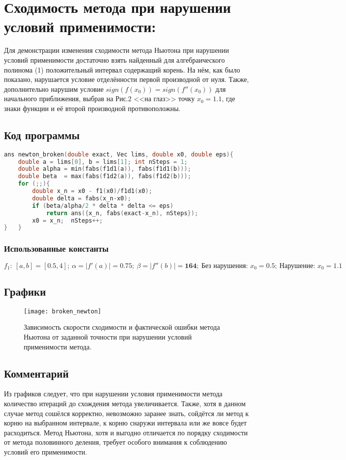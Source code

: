 \clearpage

\section{Сходимость метода при нарушении условий применимости:}
Для демонстрации изменения сходимости метода Ньютона при нарушении условий применимости достаточно взять найденный  для алгебраического полинома (1) положительный интервал содержащий корень. На нём, как было показано, нарушается условие отделённости первой производной от нуля. Также, дополнительно нарушим условие $sign(f(x_0))=sign(f''(x_0))$ для начального приближения, выбрав на Рис.2 <<на глаз>> точку $x_0=1.1$, где знаки функции и её второй производной противоположны.
\subsection{Код программы}
\begin{lstlisting}[language=c++, firstnumber=39]
ans newton_broken(double exact, Vec lims, double x0, double eps){
    double a = lims[0], b = lims[1]; int nSteps = 1;
    double alpha = min(fabs(f1d1(a)), fabs(f1d1(b)));
    double beta  = max(fabs(f1d2(a)), fabs(f1d2(b)));
    for (;;){
        double x_n = x0 - f1(x0)/f1d1(x0);
        double delta = fabs(x_n-x0);
        if (beta/alpha/2 * delta * delta <= eps)
            return ans({x_n, fabs(exact-x_n), nSteps});
        x0 = x_n;  nSteps++;
}   }
\end{lstlisting}
\subsubsection{Использованные константы}
\begin{equation}
    f_1: ~ [a,b] =\mathit{[0.5, 4]}; ~ \alpha=|f'(a)|=\mathbf{0.75}; ~ \beta=|f''(b)|=\mathbf{164}; ~ \text{Без нарушения: }x_0=\mathbf{0.5}; ~ \text{Нарушение: }x_0=\mathbf{1.1}
\end{equation}
\subsection{Графики}
\begin{figure}[H]
    \centering
    \caption{Зависимость скорости сходимости и фактической ошибки метода Ньютона от заданной точности при нарушении условий применимости метода.}
    \label{fig:pic6}
    \texttt{[image: broken\_newton]}
\end{figure}
\subsection{Комментарий}
Из графиков следует, что при нарушении условия применимости метода количество итераций до схождения метода увеличивается. Также, хотя в данном случае метод сошёлся корректно, невозможно заранее знать, сойдётся ли метод к корню на выбранном интервале, к корню снаружи интервала или же вовсе будет расходиться. Метод Ньютона, хотя и выгодно отличается по порядку сходимости от метода половинного деления, требует особого внимания к соблюдению условий его применимости.

